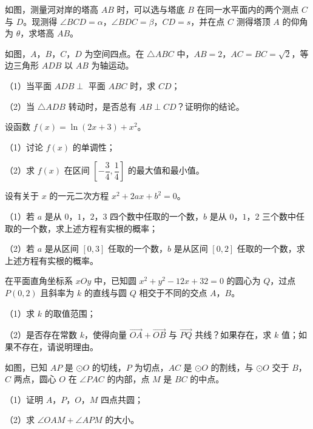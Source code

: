 \Needspace{0.4\textheight}
\begin{question}
如图，测量河对岸的塔高 $AB$ 时，可以选与塔底 $B$ 在同一水平面内的两个测点 $C$ 与 $D$。现测得 $\angle BCD=\alpha$，$\angle BDC=\beta$，$CD=s$，并在点 $C$ 测得塔顶 $A$ 的仰角为 $\theta$，求塔高 $AB$。
\nopagebreak[4]
\begin{center}\end{center}
\nopagebreak[4]
\Needspace{0.4\textheight}
\end{question}
\begin{question}
如图，$A$，$B$，$C$，$D$ 为空间四点。在 $\triangle ABC$ 中，$AB=2$，$AC=BC=\sqrt2$，等边三角形 $ADB$ 以 $AB$ 为轴运动。

（1）当平面 $ADB\perp$ 平面 $ABC$ 时，求 $CD$；

（2）当 $\triangle ADB$ 转动时，是否总有 $AB\perp CD$？证明你的结论。
\nopagebreak[4]
\begin{center}\end{center}
\nopagebreak[4]
\end{question}
\begin{question}
设函数 $f(x)=\ln(2x+3)+x^2$。

（1）讨论 $f(x)$ 的单调性；

（2）求 $f(x)$ 在区间 $\left[-\dfrac34,\dfrac14\right]$ 的最大值和最小值。

\end{question}
\begin{question}
设有关于 $x$ 的一元二次方程 $x^2+2ax+b^2=0$。

（1）若 $a$ 是从 $0$，$1$，$2$，$3$ 四个数中任取的一个数，$b$ 是从 $0$，$1$，$2$ 三个数中任取的一个数，求上述方程有实根的概率；

（2）若 $a$ 是从区间 $[0,3]$ 任取的一个数，$b$ 是从区间 $[0,2]$ 任取的一个数，求上述方程有实根的概率。

\end{question}
\begin{question}
在平面直角坐标系 $xOy$ 中，已知圆 $x^2+y^2-12x+32=0$ 的圆心为 $Q$，过点 $P(0,2)$ 且斜率为 $k$ 的直线与圆 $Q$ 相交于不同的交点 $A$，$B$。

（1）求 $k$ 的取值范围；

（2）是否存在常数 $k$，使得向量 $\overrightarrow{OA}+\overrightarrow{OB}$ 与 $\overrightarrow{PQ}$ 共线？如果存在，求 $k$ 值；如果不存在，请说明理由。

\Needspace{0.4\textheight}
\end{question}
\begin{question}
如图，已知 $AP$ 是 $\odot O$ 的切线，$P$ 为切点，$AC$ 是 $\odot O$ 的割线，与 $\odot O$ 交于 $B$，$C$ 两点，圆心 $O$ 在 $\angle PAC$ 的内部，点 $M$ 是 $BC$ 的中点。

（1）证明 $A$，$P$，$O$，$M$ 四点共圆；

（2）求 $\angle OAM+\angle APM$ 的大小。
\nopagebreak[4]
\begin{center}\end{center}
\nopagebreak[4]
\end{question}

